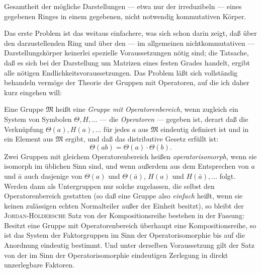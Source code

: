 \documentclass[12pt,a4paper]{article}
\theoremstyle{definition}
\begin{document}
\medskip

Gesamtheit der m\"ogliche Darstellungen --- etwa nur der irreduzibeln ---
eines gegebenen Ringes in einem gegebenen, nicht notwendig kommutativen
K\"orper.

Das erste Problem ist das weitaus einfachere, was sich schon darin
zeigt, da\ss{} \"uber den darzustellenden Ring und \"uber den --- im
allgemeinen nichtkommutativen --- Darstellungsk\"orper keinerlei
spezielle Voraussetzungen n\"otig sind; die Tatsache, da\ss{} es sich bei
der Darstellung um Matrizen eines festen Grades handelt, ergibt alle
n\"otigen Endlichkeitsvoraussetzungen. Das Problem l\"a\ss t sich
vollst\"andig behandeln verm\"oge der Theorie der Gruppen mit Operatoren,
auf die ich daher kurz eingehen will:

Eine Gruppe $\mathfrak{M}$ hei\ss t eine \textit{Gruppe mit
Operatorenbereich}, wenn zugleich ein System von Symbolen $\Theta, H,
\dots$ --- die \textit{Operatoren} --- gegeben ist, derart da\ss{} die
Verkn\"upfung $\Theta(a), H(a), \dots$ f\"ur jedes $a$ aus $\mathfrak{M}$
eindeutig definiert ist und in ein Element aus $\mathfrak{M}$ ergibt, und
da\ss{} das distributive Gesetz erf\"ullt ist:
\[
\Theta(ab) = \Theta(a) \cdot \Theta(b).
\]
Zwei Gruppen mit gleichem Operatorenbereich hei\ss en
\textit{operatorisomorph}, wenn sie isomorph im \"ublichen Sinn sind, und
wenn au\ss erdem aus dem Entsprechen von $a$ und $\bar{a}$ auch dasjenige
von $\Theta(a)$ und $\Theta(\bar{a})$, $H(a)$ und $H(\bar{a}), \dots$
folgt. Werden dann als Untergruppen nur solche zugelassen, die selbst den
Operatorenbereich gestatten (so da\ss{} eine Gruppe also \textit{einfach}
hei\ss t, wenn sie keinen zul\"assigen echten Normalteiler au\ss er der
Einheit besitzt), so bleibt der \textsc{Jordan-H\"oldersche} Satz von der
Kompositionsreihe bestehen in der Fassung: Besitzt eine Gruppe mit
Operatorenbereich \"uberhaupt eine Kompositionsreihe, so ist das System
der Faktorgruppen im Sinn der Operatorisomorphie bis auf die Anordnung
eindeutig bestimmt. Und unter derselben Voraussetzung gilt der Satz von
der im Sinn der Operatorisomorphie eindeutigen Zerlegung in direkt
unzerlegbare Faktoren.
\end{document}
